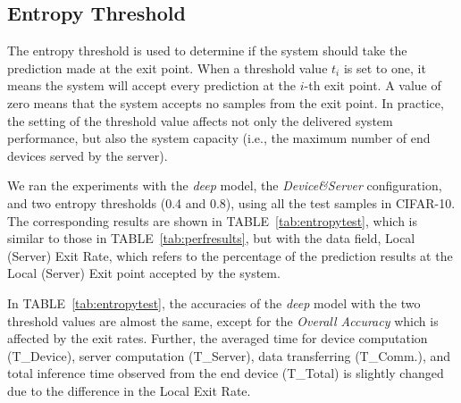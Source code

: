 \documentclass[conference]{IEEEtran}
\def\tablename{TABLE}
\begin{document}



\subsection{Entropy Threshold}
The entropy threshold is used to determine if the system should take the prediction made at the exit point. When a threshold value $t_{i}$ is set to one, it means the system will accept every prediction at the $i$-th exit point. A value of zero means that the system accepts no samples from the exit point. In practice, the setting of the threshold value affects not only the delivered system performance, but also the system capacity (i.e., the maximum number of end devices served by the server).

We ran the experiments with the \emph{deep} model, the \emph{Device\&Server} configuration, and two entropy thresholds (0.4 and 0.8), using all the test samples in CIFAR-10. The corresponding results are shown in \tablename~\ref{tab:entropytest}, which is similar to those in \tablename~\ref{tab:perfresults}, but with the data field, Local (Server) Exit Rate, which refers to the percentage of the prediction results at the Local (Server) Exit point accepted by the system.

In \tablename~\ref{tab:entropytest}, the accuracies of the \emph{deep} model with the two threshold values are almost the same, except for the \emph{Overall Accuracy} which is affected by the exit rates. Further, the averaged time for device computation (T\_Device), server computation (T\_Server), data transferring (T\_Comm.), and total inference time observed from the end device (T\_Total) is slightly changed due to the difference in the Local Exit Rate.
\end{document}
